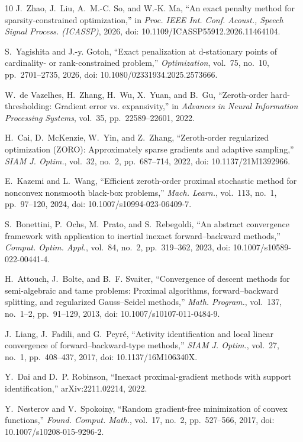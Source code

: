 \begin{thebibliography}{10}
J.~Zhao, J.~Liu, A.~M.-C. So, and W.-K. Ma,
``An exact penalty method for sparsity-constrained optimization,''
in \emph{Proc. IEEE Int. Conf. Acoust., Speech Signal Process. (ICASSP)}, 2026,
doi: 10.1109/ICASSP55912.2026.11464104.

S.~Yagishita and J.-y. Gotoh,
``Exact penalization at d-stationary points of cardinality- or rank-constrained problem,''
\emph{Optimization}, vol.~75, no.~10, pp.~2701--2735, 2026,
doi: 10.1080/02331934.2025.2573666.

W.~de Vazelhes, H.~Zhang, H.~Wu, X.~Yuan, and B.~Gu,
``Zeroth-order hard-thresholding: Gradient error vs. expansivity,''
in \emph{Advances in Neural Information Processing Systems}, vol.~35, pp.~22589--22601, 2022.

H.~Cai, D.~McKenzie, W.~Yin, and Z.~Zhang,
``Zeroth-order regularized optimization (ZORO): Approximately sparse gradients and adaptive sampling,''
\emph{SIAM J. Optim.}, vol.~32, no.~2, pp.~687--714, 2022,
doi: 10.1137/21M1392966.

E.~Kazemi and L.~Wang,
``Efficient zeroth-order proximal stochastic method for nonconvex nonsmooth black-box problems,''
\emph{Mach. Learn.}, vol.~113, no.~1, pp.~97--120, 2024,
doi: 10.1007/s10994-023-06409-7.

S.~Bonettini, P.~Ochs, M.~Prato, and S.~Rebegoldi,
``An abstract convergence framework with application to inertial inexact forward--backward methods,''
\emph{Comput. Optim. Appl.}, vol.~84, no.~2, pp.~319--362, 2023,
doi: 10.1007/s10589-022-00441-4.

H.~Attouch, J.~Bolte, and B.~F. Svaiter,
``Convergence of descent methods for semi-algebraic and tame problems: Proximal algorithms, forward--backward splitting, and regularized Gauss--Seidel methods,''
\emph{Math. Program.}, vol.~137, no.~1--2, pp.~91--129, 2013,
doi: 10.1007/s10107-011-0484-9.

J.~Liang, J.~Fadili, and G.~Peyr\'e,
``Activity identification and local linear convergence of forward--backward-type methods,''
\emph{SIAM J. Optim.}, vol.~27, no.~1, pp.~408--437, 2017,
doi: 10.1137/16M106340X.

Y.~Dai and D.~P. Robinson,
``Inexact proximal-gradient methods with support identification,''
arXiv:2211.02214, 2022.

Y.~Nesterov and V.~Spokoiny,
``Random gradient-free minimization of convex functions,''
\emph{Found. Comput. Math.}, vol.~17, no.~2, pp.~527--566, 2017,
doi: 10.1007/s10208-015-9296-2.
\end{thebibliography}
